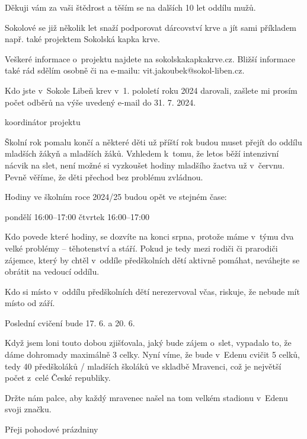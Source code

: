 \documentclass[11pt]{article}
\begin{document}
Děkuji vám za vaši štědrost a těším se na dalších 10 let oddílu mužů.

\signature{Josef Kubišta}

\vspace*{24pt}

Sokolové se již několik let snaží podporovat dárcovství krve a jít sami příkladem např. také projektem Sokolská kapka krve.

Veškeré informace o~projektu najdete na sokolskakapkakrve.cz. Bližší informace také rád sdělím osobně či na e-mailu: vit.jakoubek@sokol-liben.cz.

Kdo jste v~Sokole Libeň krev v~1. pololetí roku 2024 darovali, zašlete mi prosím počet odběrů na výše uvedený e-mail do 31. 7. 2024.

\signature{Vít Jakoubek}{koordinátor projektu}


\clearpage
{}
Školní rok pomalu končí a některé děti už příští rok budou muset přejít do oddílu mladších žákyň a mladších žáků. Vzhledem k~tomu, že letos běží intenzivní nácvik na slet, není možné si vyzkoušet hodiny mladšího žactva už v~červnu. Pevně věříme, že děti přechod bez problému zvládnou.

Hodiny ve školním roce 2024/25 budou opět ve stejném čase:

\vspace*{6pt}
pondělí 16:00–17:00
čtvrtek 16:00–17:00
\vspace*{6pt}

Kdo povede které hodiny, se dozvíte na konci srpna, protože máme v~týmu dva velké \luv{}problémy\ruv{} – těhotenství a stáří.
Pokud je tedy mezi rodiči či prarodiči zájemce, který by chtěl v~oddíle předškolních dětí aktivně pomáhat, neváhejte se obrátit na vedoucí oddílu.

Kdo si místo v~oddílu předškolních dětí nerezervoval včas, riskuje, že nebude mít místo od září.

Poslední cvičení bude 17. 6. a 20. 6.

Když jsem loni touto dobou zjišťovala, jaký bude zájem o~slet, vypadalo to, že dáme dohromady maximálně 3 celky. Nyní víme, že bude v~Edenu cvičit 5 celků, tedy 40 předškoláků / mladších školáků ve skladbě Mravenci, což je největší počet z~celé České republiky.

Držte nám palce, aby každý mravenec našel na tom velkém stadionu v~Edenu svoji značku.


Přeji pohodové prázdniny 
\end{document}
